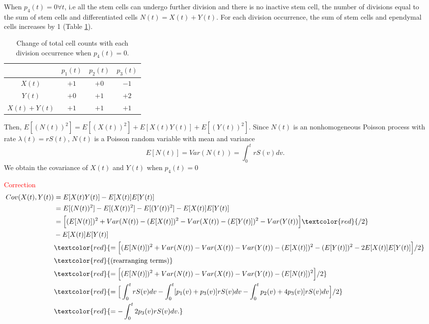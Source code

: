 \documentclass[10pt]{article}
\begin{document}
When $p_4(t) = 0 \forall t$, i.e all the stem cells can undergo further division and there is no inactive stem cell, the number of divisions equal to the sum of stem cells and differentiated cells $N(t) = X(t) + Y(t)$. For each division occurrence, the sum of stem cells and ependymal cells increases by 1 (Table \ref{tab:cellchange}).
\begin{table}[!h]
\begin{center}
\begin{tabular}{ |c|c|c|c| }
 \hline
  & $p_1(t)$ & $p_2(t)$ & $p_3(t)$ \\
\hline
 $X(t)$ & $+1$ & $+0$ & $-1$ \\
 $Y(t)$ & $+0$ & $+1$ & $+2$ \\
 \hline
$X(t) + Y(t)$ & $+1$ & $+1$& $+1$\\
\hline
\end{tabular}
\end{center}
\caption{Change of total cell counts with each division occurrence when $p_4(t) = 0$.}
\label{tab:cellchange}
\end{table}
Then, $E[(N(t))^2] = E[(X(t))^2] + E[X(t)Y(t)] + E[(Y(t))^2]$. Since $N(t)$ is an nonhomogeneous Poisson process with rate $\lambda(t) = r S(t)$, $N(t)$ is a Poisson random variable with mean and variance
$$E[N(t)]=Var(N(t))=\int_0^t r S(v)dv.$$
We obtain the covariance of $X(t)$ and $Y(t)$ when $p_4(t) = 0$

\textcolor{red}{Correction}
\begin{equation}
\begin{split}
Cov(X(t), Y(t)) & =  E[X(t)Y(t)] -E[X(t)] E[Y(t)]  \\
& = E[(N(t))^2] - E[(X(t))^2] - E[(Y(t))^2] - E[X(t)] E[Y(t)]   \\
& = \Big[(E[N(t)])^2 + Var(N(t))  - (E[X(t)])^2 - Var(X(t))  - (E[Y(t)])^2 - Var(Y(t))\Big]\textcolor{red}{/2} \\
& - E[X(t)] E[Y(t)] \\
& \textcolor{red}{=\Big[(E[N(t)])^2 + Var(N(t))   - Var(X(t))   - Var(Y(t))- (E[X(t)])^2- (E[Y(t)])^2- 2E[X(t)] E[Y(t)]\Big]/2}\\
& \textcolor{red}{\text{(rearranging terms)}} \\
& \textcolor{red}{=\Big[(E[N(t)])^2 + Var(N(t))   - Var(X(t))   - Var(Y(t))- (E[N(t)])^2\Big]/2}\\
& \textcolor{red}{=\Big[\int_0^t r S(v) dv - \int_0^t  [p_1(v) +p_3(v)] r S(v) dv - \int_0^t  p_2(v) + 4p_3(v)] r S(v) dv\Big]/2}  \\
& \textcolor{red}{=- \int_0^t 2p_3(v) r S(v) dv.}
\end{split}
\end{equation}
\end{document}
